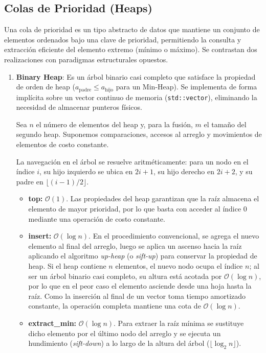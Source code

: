 \documentclass[11pt,letterpaper]{article}
\begin{document}
\subsection{Colas de Prioridad (Heaps)}

Una cola de prioridad es un tipo abstracto de datos que mantiene un conjunto de elementos ordenados bajo una clave de prioridad, permitiendo la consulta y extracción eficiente del elemento extremo (mínimo o máximo). Se contrastan dos realizaciones con paradigmas estructurales opuestos.

\begin{enumerate}
    \item
    \textbf{Binary Heap}: Es un árbol binario casi completo que satisface la propiedad de orden de heap ($a_{\text{padre}} \le a_{\text{hijo}}$ para un Min-Heap). Se implementa de forma implícita sobre un vector continuo de memoria (\texttt{std::vector}), eliminando la necesidad de almacenar punteros físicos.
    
    Sea $n$ el número de elementos del heap y, para la fusión, $m$ el tamaño del segundo heap. Suponemos comparaciones, accesos al arreglo y movimientos de elementos de costo constante.
    
    La navegación en el árbol se resuelve aritméticamente: para un nodo en el índice $i$, su hijo izquierdo se ubica en $2i+1$, su hijo derecho en $2i+2$, y su padre en $\lfloor (i-1)/2 \rfloor$.

\begin{itemize}
    \item \textbf{top:} $\mathcal{O}(1)$. Las propiedades del heap garantizan que la raíz almacena el elemento de mayor prioridad, por lo que basta con acceder al índice $0$ mediante una operación de costo constante.
    
    \item \textbf{insert:} $\mathcal{O}(\log n)$. En el procedimiento convencional, se agrega el nuevo elemento al final del arreglo, luego se aplica un ascenso hacia la raíz aplicando el algoritmo \textit{up-heap} (o \textit{sift-up}) para conservar la propiedad de heap. Si el heap contiene $n$ elementos, el nuevo nodo ocupa el índice $n$; al ser un árbol binario casi completo, su altura está acotada por $\mathcal{O}(\log n)$, por lo que en el peor caso el elemento asciende desde una hoja hasta la raíz. Como la inserción al final de un vector toma tiempo amortizado constante, la operación completa mantiene una cota de $\mathcal{O}(\log n)$.
    
    \item \textbf{extract\_min:} $\mathcal{O}(\log n)$. Para extraer la raíz mínima se sustituye dicho elemento por el último nodo del arreglo y se ejecuta un hundimiento (\textit{sift-down}) a lo largo de la altura del árbol ($\lfloor \log_2 n \rfloor$).
    

\end{itemize}
\end{enumerate}
\end{document}
